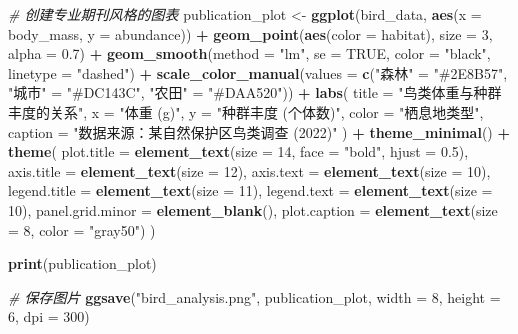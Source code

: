 \documentclass[
]{book}
\newenvironment{Shaded}{\begin{snugshade}}{\end{snugshade}}
\newcommand{\AttributeTok}[1]{\textcolor[rgb]{0.13,0.29,0.53}{#1}}
\newcommand{\CommentTok}[1]{\textcolor[rgb]{0.56,0.35,0.01}{\textit{#1}}}
\newcommand{\ConstantTok}[1]{\textcolor[rgb]{0.56,0.35,0.01}{#1}}
\newcommand{\DecValTok}[1]{\textcolor[rgb]{0.00,0.00,0.81}{#1}}
\newcommand{\FloatTok}[1]{\textcolor[rgb]{0.00,0.00,0.81}{#1}}
\newcommand{\FunctionTok}[1]{\textcolor[rgb]{0.13,0.29,0.53}{\textbf{#1}}}
\newcommand{\NormalTok}[1]{#1}
\newcommand{\OtherTok}[1]{\textcolor[rgb]{0.56,0.35,0.01}{#1}}
\newcommand{\SpecialCharTok}[1]{\textcolor[rgb]{0.81,0.36,0.00}{\textbf{#1}}}
\newcommand{\StringTok}[1]{\textcolor[rgb]{0.31,0.60,0.02}{#1}}
\begin{document}
\begin{Shaded}
\begin{Highlighting}[]
\CommentTok{\# 创建专业期刊风格的图表}
\NormalTok{publication\_plot }\OtherTok{\textless{}{-}} \FunctionTok{ggplot}\NormalTok{(bird\_data, }\FunctionTok{aes}\NormalTok{(}\AttributeTok{x =}\NormalTok{ body\_mass, }\AttributeTok{y =}\NormalTok{ abundance)) }\SpecialCharTok{+}
  \FunctionTok{geom\_point}\NormalTok{(}\FunctionTok{aes}\NormalTok{(}\AttributeTok{color =}\NormalTok{ habitat), }\AttributeTok{size =} \DecValTok{3}\NormalTok{, }\AttributeTok{alpha =} \FloatTok{0.7}\NormalTok{) }\SpecialCharTok{+}
  \FunctionTok{geom\_smooth}\NormalTok{(}\AttributeTok{method =} \StringTok{"lm"}\NormalTok{, }\AttributeTok{se =} \ConstantTok{TRUE}\NormalTok{, }\AttributeTok{color =} \StringTok{"black"}\NormalTok{, }\AttributeTok{linetype =} \StringTok{"dashed"}\NormalTok{) }\SpecialCharTok{+}
  \FunctionTok{scale\_color\_manual}\NormalTok{(}\AttributeTok{values =} \FunctionTok{c}\NormalTok{(}\StringTok{"森林"} \OtherTok{=} \StringTok{"\#2E8B57"}\NormalTok{, }\StringTok{"城市"} \OtherTok{=} \StringTok{"\#DC143C"}\NormalTok{, }\StringTok{"农田"} \OtherTok{=} \StringTok{"\#DAA520"}\NormalTok{)) }\SpecialCharTok{+}
  \FunctionTok{labs}\NormalTok{(}
    \AttributeTok{title =} \StringTok{"鸟类体重与种群丰度的关系"}\NormalTok{,}
    \AttributeTok{x =} \StringTok{"体重 (g)"}\NormalTok{,}
    \AttributeTok{y =} \StringTok{"种群丰度 (个体数)"}\NormalTok{,}
    \AttributeTok{color =} \StringTok{"栖息地类型"}\NormalTok{,}
    \AttributeTok{caption =} \StringTok{"数据来源：某自然保护区鸟类调查 (2022)"}
\NormalTok{  ) }\SpecialCharTok{+}
  \FunctionTok{theme\_minimal}\NormalTok{() }\SpecialCharTok{+}
  \FunctionTok{theme}\NormalTok{(}
    \AttributeTok{plot.title =} \FunctionTok{element\_text}\NormalTok{(}\AttributeTok{size =} \DecValTok{14}\NormalTok{, }\AttributeTok{face =} \StringTok{"bold"}\NormalTok{, }\AttributeTok{hjust =} \FloatTok{0.5}\NormalTok{),}
    \AttributeTok{axis.title =} \FunctionTok{element\_text}\NormalTok{(}\AttributeTok{size =} \DecValTok{12}\NormalTok{),}
    \AttributeTok{axis.text =} \FunctionTok{element\_text}\NormalTok{(}\AttributeTok{size =} \DecValTok{10}\NormalTok{),}
    \AttributeTok{legend.title =} \FunctionTok{element\_text}\NormalTok{(}\AttributeTok{size =} \DecValTok{11}\NormalTok{),}
    \AttributeTok{legend.text =} \FunctionTok{element\_text}\NormalTok{(}\AttributeTok{size =} \DecValTok{10}\NormalTok{),}
    \AttributeTok{panel.grid.minor =} \FunctionTok{element\_blank}\NormalTok{(),}
    \AttributeTok{plot.caption =} \FunctionTok{element\_text}\NormalTok{(}\AttributeTok{size =} \DecValTok{8}\NormalTok{, }\AttributeTok{color =} \StringTok{"gray50"}\NormalTok{)}
\NormalTok{  )}

\FunctionTok{print}\NormalTok{(publication\_plot)}

\CommentTok{\# 保存图片}
\FunctionTok{ggsave}\NormalTok{(}\StringTok{"bird\_analysis.png"}\NormalTok{, publication\_plot, }
       \AttributeTok{width =} \DecValTok{8}\NormalTok{, }\AttributeTok{height =} \DecValTok{6}\NormalTok{, }\AttributeTok{dpi =} \DecValTok{300}\NormalTok{)}
\end{Highlighting}
\end{Shaded}
\end{document}
